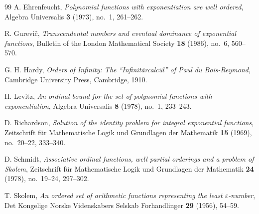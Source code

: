 \documentclass[11pt]{article}
\theoremstyle{definition}
\theoremstyle{remark}
\numberwithin{equation}{section}
\begin{document}
\begin{thebibliography}{99}
 A. Ehrenfeucht,
\emph{Polynomial functions with exponentiation are well ordered},
Algebra Universalis \textbf{3} (1973), no.~1, 261--262.

 R. Gurevi\v{c},
\emph{Transcendental numbers and eventual dominance of exponential functions},
Bulletin of the London Mathematical Society \textbf{18} (1986),
no.~6, 560--570.

 G. H. Hardy,
\emph{Orders of Infinity: The ``Infinit\"arcalc\"ul'' of Paul du Bois-Reymond},
Cambridge University Press, Cambridge, 1910.

 H. Levitz,
\emph{An ordinal bound for the set of polynomial functions with exponentiation},
Algebra Universalis \textbf{8} (1978), no.~1, 233--243.

 D. Richardson,
\emph{Solution of the identity problem for integral exponential functions},
Zeitschrift f\"ur Mathematische Logik und Grundlagen der Mathematik
\textbf{15} (1969), no.~20--22, 333--340.

 D. Schmidt,
\emph{Associative ordinal functions, well partial orderings and a problem
of Skolem},
Zeitschrift f\"ur Mathematische Logik und Grundlagen der Mathematik
\textbf{24} (1978), no.~19--24, 297--302.

 T. Skolem,
\emph{An ordered set of arithmetic functions representing the least
$\varepsilon$-number},
Det Kongelige Norske Videnskabers Selskab Forhandlinger
\textbf{29} (1956), 54--59.
\end{thebibliography}
\end{document}
